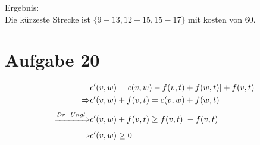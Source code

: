 \documentclass[a4paper,10pt,german]{scrartcl}
\begin{document}
Ergebnis:\\

Die k\"urzeste Strecke ist $\{9-13,12-15,15-17\} $ mit kosten von 60.
\section{Aufgabe 20}
\begin{align}
	&c'(v,w) = c(v,w) - f(v,t) + f(w,t) | + f(v,t)\\
	\xRightarrow{} &c'(v,w) + f(v,t) = c(v,w) + f(w,t)\\
	\xRightarrow{Dr-Ungl} &c'(v,w) + f(v,t) \ge f(v,t) | - f(v,t)\\
	\xRightarrow{} &c'(v,w) \ge 0
\end{align}
\end{document}
